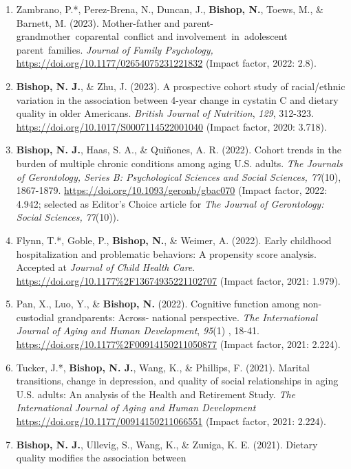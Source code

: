\documentclass[
]{article}
\begin{document}
\begin{enumerate}
\def\labelenumi{\arabic{enumi}.}
\item
  Zambrano, P.*, Perez-Brena, N., Duncan, J., \textbf{Bishop, N.},
  Toews, M., \& Barnett, M. (2023). Mother-father and
  parent-grandmother~coparental~conflict and involvement~in~adolescent
  parent~families. \emph{Journal of Family Psychology,}
  \url{https://doi.org/10.1177/02654075231221832} (Impact factor, 2022:
  2.8).
\item
  \textbf{Bishop, N. J.}, \& Zhu, J. (2023). A prospective cohort study
  of racial/ethnic variation in the association between 4-year change in
  cystatin C and dietary quality in older Americans. \emph{British
  Journal of Nutrition}, \emph{129}, 312-323.
  \url{https://doi.org/10.1017/S0007114522001040} (Impact factor, 2020:
  3.718).
\item
  \textbf{Bishop, N. J.}, Haas, S. A., \& Quiñones, A. R. (2022). Cohort
  trends in the burden of multiple chronic conditions among aging U.S.
  adults. \emph{The Journals of Gerontology, Series B: Psychological
  Sciences and Social Sciences, 77}(10), 1867-1879.
  \url{https://doi.org/10.1093/geronb/gbac070} (Impact factor, 2022:
  4.942; selected as Editor's Choice article for \emph{The Journal of
  Gerontology: Social Sciences,} \emph{77}(10)).
\item
  Flynn, T.*, Goble, P., \textbf{Bishop, N.}, \& Weimer, A. (2022).
  Early childhood hospitalization and problematic behaviors: A
  propensity score analysis. Accepted at \emph{Journal of Child Health
  Care}. \url{https://doi.org/10.1177\%2F13674935221102707} (Impact
  factor, 2021: 1.979).
\item
  Pan, X., Luo, Y., \& \textbf{Bishop, N.} (2022). Cognitive function
  among non-custodial grandparents: Across- national perspective.
  \emph{The International Journal of Aging and Human Development},
  \emph{95}(1) , 18-41.
  \url{https://doi.org/10.1177\%2F00914150211050877} (Impact factor,
  2021: 2.224).
\item
  Tucker, J.*, \textbf{Bishop, N. J.}, Wang, K., \& Phillips, F. (2021).
  Marital transitions, change in depression, and quality of social
  relationships in aging U.S. adults: An analysis of the Health and
  Retirement Study. \emph{The International Journal of Aging and Human
  Development} \url{https://doi.org/10.1177/00914150211066551} (Impact
  factor, 2021: 2.224).
\item
  \textbf{Bishop, N. J.}, Ullevig, S., Wang, K., \& Zuniga, K. E.
  (2021). Dietary quality modifies the association between

\end{enumerate}
\end{document}
